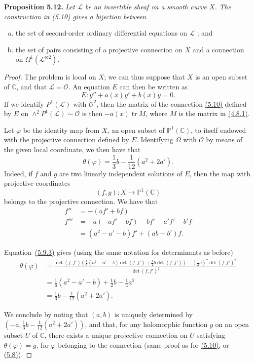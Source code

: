 \documentclass{report}
\newenvironment{itenv}[1]
  {\phantomsection\par\medskip\noindent\textbf{#1.}\itshape}
  {\par\medskip}
\newcommand{\scr}[1]{{\mathscr{#1}}}
\renewcommand{\cal}[1]{{\mathcal{#1}}}
\newcommand{\PP}{\mathbb{P}}
\newcommand{\CC}{\mathbb{C}}
\newcommand{\detrow}[2]{\operatorname{det}(#1,#2)}
\DeclareMathOperator{\tr}{tr}
\newcommand{\oldpage}[1]{\marginpar{\footnotesize$\Big\vert$ \textit{p.~#1}}}
\begin{document}
\begin{itenv}{Proposition 5.12}
\label{I.5.12}
  Let $\scr{L}$ be an invertible sheaf on a smooth curve $X$.
  The construction in \hyperref[I.5.10]{(5.10)} gives a bijection between
  \begin{enumerate}[a)]
    \item the set of second-order ordinary differential equations on $\scr{L}$ ; and
\oldpage{36}
    \item the set of pairs consisting of a projective connection on $X$ and a connection on $\Omega^1(\scr{L}^{\otimes2})$.
  \end{enumerate}
\end{itenv}

\begin{proof}
  The problem is local on $X$;
  we can thus suppose that $X$ is an open subset of $\CC$, and that $\scr{L}=\cal{O}$.
  An equation $E$ can then be written as
  \[
    E\colon y'' + a(x)y' + b(x)y = 0.
  \]
  If we identify $P^1(\scr{L})$ with $\cal{O}^2$, then the matrix of the connection \hyperref[I.5.10]{(5.10)} defined by $E$ on $\wedge^2 P^1(\scr{L})\sim\cal{O}$ is then $-a(x)\tr M$, where $M$ is the matrix in \hyperref[I.4.8.1]{(4.8.1)}.

  Let $\varphi$ be the identity map from $X$, an open subset of $\PP^1(\CC)$, to itself endowed with the projective connection defined by $E$.
  Identifying $\Omega$ with $\cal{O}$ by means of the given local coordinate, we then have that
  \[
  \label{I.5.12.1}
    \theta(\varphi) = \frac13b - \frac{1}{12}(a^2+2a').
  \tag{5.12.1}
  \]
  Indeed, if $f$ and $g$ are two linearly independent solutions of $E$, then the map with projective coordinates
  \[
    (f,g)\colon X\to\PP^1(\CC)
  \]
  belongs to the projective connection.
  We have that
  \[
    \begin{aligned}
      f''
      &= -(af'+bf)
    \\f'''
      &= -a(-af'-bf) - bf' - a'f' - b'f
    \\&= (a^2-a'-b)f' + (ab-b')f.
    \end{aligned}
  \]

  Equation~\hyperref[I.5.9.3]{(5.9.3)} gives (using the same notation for determinants as before)
  \[
    \begin{aligned}
      \theta(\varphi)
      &= \frac{
        \detrow{f}{f'}
        \left(
          \frac16(a^2-a'-b)\detrow{f}{f'}
          +\frac12 b\detrow{f}{f'}
        \right)
        - (\frac12a)^2\detrow{f}{f'}^2
      }{
        \detrow{f}{f'}^2
      }
    \\&= \frac16(a^2-a'-b) + \frac12 b - \frac14 a^2
    \\&= \frac13 b - \frac{1}{12}(a^2+2a').
    \end{aligned}
  \]

  We conclude by noting that $(a,b)$ is uniquely determined by $(-a,\frac13b-\frac{1}{12}(a^2+2a'))$, and that, for any holomorphic function $g$ on an open subset $U$ of $\CC$, there exists a unique projective connection on $U$ satisfying $\theta(\varphi)=g$, for $\varphi$ belonging to the connection (same proof as for \hyperref[I.5.10]{(5.10)}, or \hyperref[I.5.8]{(5.8)}).
\end{proof}
\end{document}
